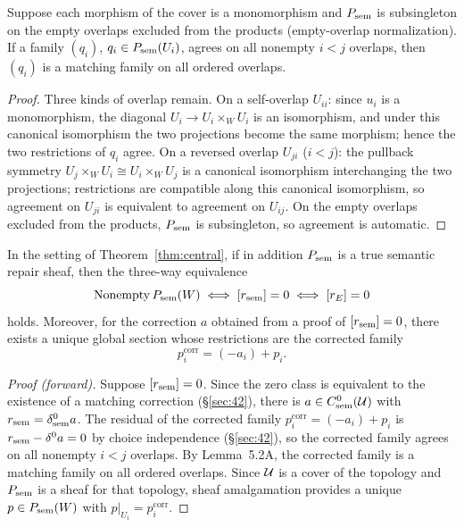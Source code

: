 \begin{lemmafiveA}
Suppose each morphism of the cover is a monomorphism and $P_{\mathrm{sem}}$ is
subsingleton on the empty overlaps excluded from the products
(empty-overlap normalization). If a family $(q_i)$,
$q_i\in P_{\mathrm{sem}}(U_i)$, agrees on all nonempty $i<j$ overlaps, then
$(q_i)$ is a matching family on all ordered overlaps.
\end{lemmafiveA}

\begin{proof}
Three kinds of overlap remain. On a self-overlap $U_{ii}$: since $u_i$
is a monomorphism, the diagonal $U_i\to U_i\times_W U_i$ is an
isomorphism, and under this canonical isomorphism the two projections
become the same morphism; hence the two restrictions of $q_i$ agree.
On a reversed overlap $U_{ji}$ ($i<j$): the pullback symmetry
$U_j\times_W U_i\cong U_i\times_W U_j$ is a canonical isomorphism
interchanging the two projections; restrictions are compatible along
this canonical isomorphism, so agreement on $U_{ji}$ is equivalent to
agreement on $U_{ij}$. On the empty overlaps excluded from the
products, $P_{\mathrm{sem}}$ is subsingleton, so agreement is automatic.
\end{proof}

\begin{theorem}\label{thm:gluing}
In the setting of Theorem~\ref{thm:central}, if in addition $P_{\mathrm{sem}}$ is
a true semantic repair sheaf, then the three-way equivalence
\[
\mathrm{Nonempty}\,P_{\mathrm{sem}}(W)
\iff
[r_{\mathrm{sem}}]=0
\iff
[r_{E}]=0
\]
holds. Moreover, for the correction $a$ obtained from a proof of
$[r_{\mathrm{sem}}]=0$, there exists a unique global section whose restrictions
are the corrected family
\[
p_i^{\mathrm{corr}}=(-a_i)+p_i.
\]
\end{theorem}

\begin{proof}[Proof (forward)]
Suppose $[r_{\mathrm{sem}}]=0$. Since the zero class is equivalent to the
existence of a matching correction (\S\ref{sec:42}), there is
$a\in C^0_{\mathrm{sem}}(\mathcal{U})$ with $r_{\mathrm{sem}}=\delta^0_{\mathrm{sem}}a$.
The residual of the corrected family $p_i^{\mathrm{corr}}=(-a_i)+p_i$
is $r_{\mathrm{sem}}-\delta^0a=0$ by choice independence (\S\ref{sec:42}), so the
corrected family agrees on all nonempty $i<j$ overlaps. By
Lemma~5.2A, the corrected family is a matching family on all ordered
overlaps. Since $\mathcal{U}$ is a cover of the topology and $P_{\mathrm{sem}}$ is a sheaf
for that topology, sheaf amalgamation provides a unique
$p\in P_{\mathrm{sem}}(W)$ with $p|_{U_i}=p_i^{\mathrm{corr}}$.
\end{proof}

